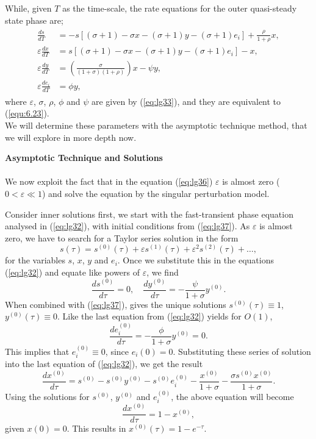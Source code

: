 \documentclass[a4paper]{report}
\theoremstyle{definition}
\begin{document}
While, given $T$ as the time-scale, the rate equations for the outer quasi-steady state phase are;
\begin{align}
\begin{split}
\frac{ds}{dT}&=-s[(\sigma +1)-\sigma x-(\sigma+1)y-(\sigma +1)e_i]+\frac{\rho}{1+\rho}x, \\
\varepsilon \frac{dx}{dT}&=s[(\sigma+1)-\sigma x-(\sigma +1)y-(\sigma +1)e_i]-x ,\\
\varepsilon \frac{dy}{dT}&=\left(\frac{\sigma}{(1+\sigma)(1+\rho)}\right)x-\psi y, \\
\varepsilon \frac{de_i}{dT}&=\phi y,
\end{split}
\label{eq:lg35}
\end{align}
where $\varepsilon$, $\sigma$, $\rho$, $\phi$ and $\psi$ are given by (\ref{eq:lg33}), and they are equivalent to (\ref{equ:6.23}).
\\
We will determine these parameters with the asymptotic technique method, that we will explore in more depth now.


\textbf{Asymptotic Technique and Solutions}
\\
\\
We now exploit the fact that in the equation (\ref{eq:lg36}) $\varepsilon$ is almost zero ($0<\varepsilon \ll 1$) and solve the equation by the singular perturbation model. 


Consider inner solutions first, we start with the fast-transient phase equation analysed in (\ref{eq:lg32}), with initial conditions from (\ref{eq:lg37}). As $\varepsilon$ is almost zero, we have to search for a Taylor series solution in the form 
\begin{equation}
s(\tau)=s^{(0)}(\tau)+\varepsilon s^{(1)}(\tau)+\varepsilon ^2s^{(2)}(\tau)+\dots ,
\label{eq:lg45}
\end{equation}
for the variables $s$, $x$, $y$ and $e_i$. Once we substitute this in the equations (\ref{eq:lg32}) and equate like powers of $\varepsilon$, we find
\begin{equation}
\frac{ds^{(0)}}{d\tau}=0, \quad \frac{dy^{(0)}}{d\tau}=-\frac{\psi}{1+\sigma}y^{(0)}.
\end{equation}
When combined with (\ref{eq:lg37}), gives the unique solutions $s^{(0)}(\tau)\equiv1$, $y^{(0)}(\tau)\equiv0$. Like the last equation from (\ref{eq:lg32}) yields for $O(1)$,
\begin{equation}
\frac{de_i^{(0)}}{d\tau}=-\frac{\phi}{1+\sigma}y^{(0)}=0.
\end{equation}
This implies that $e_i^{(0)} \equiv 0$, since $e_i(0)=0$. Substituting these series of solution into the last equation of (\ref{eq:lg32}), we get the result
\begin{equation}
\frac{dx^{(0)}}{d\tau}=s^{(0)}-s^{(0)}y^{(0)}-s^{(0)}e_i^{(0)}-\frac{x^{(0)}}{1+\sigma}-\frac{\sigma s^{(0)}x^{(0)}}{1+\sigma}.
\end{equation}
Using the solutions for $s^{(0)}$, $y^{(0)}$ and $e_i^{(0)}$, the above equation will become
\begin{equation}
\frac{dx^{(0)}}{d\tau}=1-x^{(0)},
\end{equation}
given $x(0)=0$. This results in $x^{(0)}(\tau)=1-e^{-\tau}$.
\end{document}
